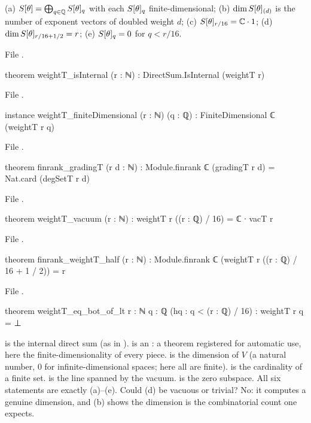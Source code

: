 \begin{theorem}\label{ch06:thm:gradingT}
(a) $S[\theta]=\bigoplus_{q\in{\mathbb{Q}}}S[\theta]_q$ with each $S[\theta]_q$ finite-dimensional;
(b) $\dim S[\theta]_{(d)}$ is the number of exponent vectors of doubled weight $d$;
(c) $S[\theta]_{r/16}={\mathbb{C}}\cdot 1$;
(d) $\dim S[\theta]_{r/16+1/2}=r$;
(e) $S[\theta]_q=0$ for $q<r/16$.
\end{theorem}
\noindent File .
\begin{leancode}
theorem weightT_isInternal (r : ℕ) : DirectSum.IsInternal (weightT r)
\end{leancode}
\noindent File .
\begin{leancode}
instance weightT_finiteDimensional (r : ℕ) (q : ℚ) : FiniteDimensional ℂ (weightT r q)
\end{leancode}
\noindent File .
\begin{leancode}
theorem finrank_gradingT (r d : ℕ) :
    Module.finrank ℂ (gradingT r d) = Nat.card (degSetT r d)
\end{leancode}
\noindent File .
\begin{leancode}
theorem weightT_vacuum (r : ℕ) : weightT r ((r : ℚ) / 16) = ℂ ∙ vacT r
\end{leancode}
\noindent File .
\begin{leancode}
theorem finrank_weightT_half (r : ℕ) :
    Module.finrank ℂ (weightT r ((r : ℚ) / 16 + 1 / 2)) = r
\end{leancode}
\noindent File .
\begin{leancode}
theorem weightT_eq_bot_of_lt {r : ℕ} {q : ℚ} (hq : q < (r : ℚ) / 16) : weightT r q = ⊥
\end{leancode}
\begin{dictionary}
 is the internal direct sum (as in ).
 is an : a theorem registered for automatic
use, here the finite-dimensionality of every piece.   is the dimension of
$V$ (a natural number, $0$ for infinite-dimensional spaces; here all are finite).
 is the cardinality of a finite set.   is the line spanned by the
vacuum.   is the zero subspace.  All six statements are exactly (a)--(e).  Could (d) be
vacuous or trivial?  No: it computes a genuine dimension, and (b) shows the dimension is the
combinatorial count one expects.
\end{dictionary}

